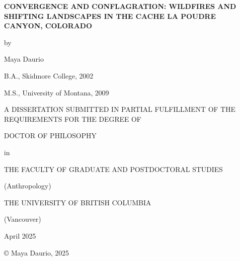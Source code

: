 \documentclass[
]{article}
\author{}
\date{\vspace{-2.5em}}
\begin{document}
\thispagestyle{empty}
\begin{singlespace} 
\begin{center}

\Huge

\textbf{CONVERGENCE AND CONFLAGRATION: WILDFIRES AND SHIFTING LANDSCAPES IN THE CACHE LA POUDRE CANYON, COLORADO}

\Large

\vspace{8mm}

by

\vspace{8mm}

\huge

Maya Daurio

\Large

\vspace{8mm}

B.A., Skidmore College, 2002

M.S., University of Montana, 2009

\vspace{10mm}

A DISSERTATION SUBMITTED IN PARTIAL FULFILLMENT OF THE REQUIREMENTS FOR THE DEGREE OF

\vspace{5mm}

DOCTOR OF PHILOSOPHY

\vspace{5mm}
in

\vspace{5mm}

THE FACULTY OF GRADUATE AND POSTDOCTORAL STUDIES

\vspace{5mm}

(Anthropology)

\vspace{5mm}

THE UNIVERSITY OF BRITISH COLUMBIA

\vspace{5mm}

(Vancouver)

\vspace{6mm}

April 2025

© Maya Daurio, 2025

\end{center}
\end{singlespace}
\normalsize
\clearpage

\setcounter{page}{2}
\end{document}
